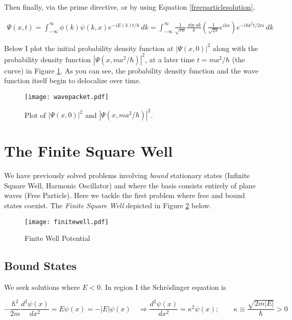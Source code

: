 Then finally, via the prime directive, or by using Equation
\ref{freeparticlesolution}, 

\begin{align} \label{solutionfree}
  \Psi(x, t) = \int_{-\infty}^{\infty} \phi(k)\psi(k, x) e^{-iE(k)t/\hbar} \,
  dk = \int_{-\infty}^{\infty} \frac{1}{\sqrt{\pi a}} \frac{\sin ak}{k} \left(
  \frac{1}{\sqrt{2\pi}} e^{ikx}\right)  e^{-i\hbar k^2 t / 2m} \, dk
\end{align} \vspace{3px}

Below I plot the initial probability density function at $|\Psi(x, 0)|^2$
along with the probability density function $|\Psi(x, ma^2 / \hbar)|^2$, at
a later time $t = ma^2 / \hbar$ (the curve) in Figure \ref{freegraph}. As you
can see, the probability density function and the wave function itself begin
to delocalize over time.

\begin{figure}[H]
  \centering
    \texttt{[image: wavepacket.pdf]}
    \caption{Plot of $|\Psi(x, 0)|^2$ and $|\Psi(x, ma^2 / \hbar)|^2$.}
    \label{freegraph}
\end{figure}

\section{The Finite Square Well} 

We have previously solved problems involving \textit{bound} stationary states
(Infinite Square Well, Harmonic Oscillator) and where the basis consists
entirely of plane waves (Free Particle). Here we tackle the first problem where
free and bound states coexist. The \textit{Finite Square Well} depicted in
Figure \ref{finitewell} below. 

\begin{figure}[H] 
  \centering
    \texttt{[image: finitewell.pdf]}
    \caption{Finite Well Potential}
    \label{finitewell}
\end{figure}



\subsection{Bound States} We seek solutions where $E < 0$. In region
I the  Schr\"odinger equation is 

\[
-\frac{\hbar^2}{2m} \frac{d^2 \psi(x)}{d x^2} = E \psi(x) = -|E|\psi(x) \quad
\Rightarrow \frac{d^2 \psi(x)}{d x^2} = \kappa^2 \psi(x); \qquad \kappa
\equiv \frac{\sqrt{2m|E|}}{\hbar} > 0
\] \vspace{3px}

